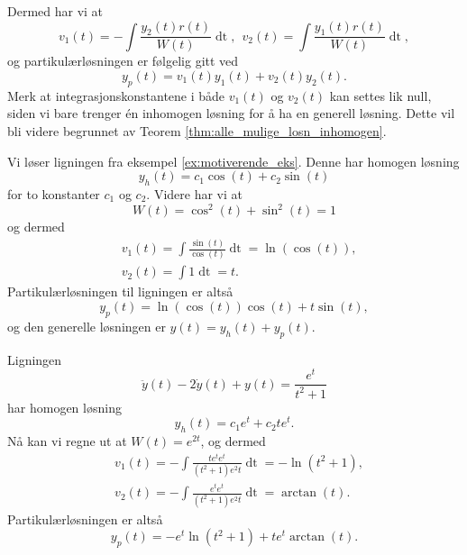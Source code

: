 \documentclass{article}
\theoremstyle{definition}
\theoremstyle{remark}
\newenvironment{ex}
{\pushQED{\qed}\renewcommand{\qedsymbol}{$\triangle$}\exx}
{\popQED\endexx}
\begin{document}
\begin{multicols*}{2}
\begin{equation*}
\end{equation*}
Dermed har vi at
\begin{equation*}
  v_1(t) = -\int \frac{y_2(t) r(t)}{W(t)} \mathop{dt}, \ \ v_2(t) = \int \frac{y_1(t) r(t)}{W(t)} \mathop{dt},
\end{equation*}
og partikulærløsningen er følgelig gitt ved
\begin{equation*}
  y_p(t) = v_1(t) y_1(t) + v_2(t) y_2(t).
\end{equation*}
Merk at integrasjonskonstantene i både $v_1(t)$ og $v_2(t)$ kan settes lik null, siden vi bare trenger én inhomogen løsning for å ha en generell løsning. Dette vil bli videre begrunnet av Teorem \ref{thm:alle_mulige_losn_inhomogen}.

\begin{ex}
  Vi løser ligningen fra eksempel \ref{ex:motiverende_eks}. Denne har homogen løsning
  \begin{equation*}
    y_h(t) = c_1 \cos(t) + c_2 \sin(t)
  \end{equation*}
  for to konstanter $c_1$ og $c_2$. Videre har vi at
  \begin{equation*}
    W(t) = \cos^2(t) + \sin^2(t) = 1
  \end{equation*}
  og dermed
  \begin{equation*}
    \begin{split}
      & v_1(t) = \int \frac{\sin(t)}{\cos(t)} \mathop{dt} = \ln(\cos(t)), \\
      & v_2(t) = \int 1 \mathop{dt} = t.
    \end{split}
  \end{equation*}
  Partikulærløsningen til ligningen er altså
  \begin{equation*}
    y_p(t) = \ln(\cos(t)) \cos(t) + t \sin(t),
  \end{equation*}
  og den generelle løsningen er $y(t) = y_h(t) + y_p(t)$.
\end{ex}

\begin{ex}
  Ligningen
  \begin{equation*}
    \ddot{y}(t) - 2\dot{y}(t) + y(t) = \frac{e^t}{t^2 + 1}
  \end{equation*}
  har homogen løsning
  \begin{equation*}
    y_h(t) = c_1 e^t + c_2 t e^{t}.
  \end{equation*}
  Nå kan vi regne ut at $W(t) = e^{2t}$, og dermed
  \begin{equation*}
    \begin{split}
      & v_1(t) = - \int \frac{t e^t e^t}{(t^2 + 1) e^2t} \mathop{dt} = - \ln(t^2 + 1), \\
      & v_2(t) = - \int \frac{e^t e^t}{(t^2 + 1) e^2t} \mathop{dt} = \arctan(t).
    \end{split}
  \end{equation*}
  Partikulærløsningen er altså
  \begin{equation*}
    y_p(t) = - e^t \ln(t^2 + 1) + t e^t \arctan(t).
  \end{equation*}
\end{ex}


\end{multicols*}
\end{document}

